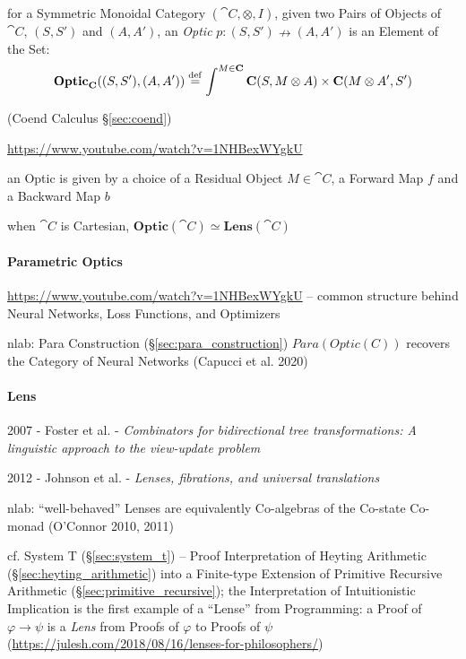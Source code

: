 for a Symmetric Monoidal Category $(\cat{C}, \otimes, I)$, given two Pairs of
Objects of $\cat{C}$, $(S, S')$ and $(A, A')$, an \emph{Optic}
$p : (S, S') \nrightarrow (A, A')$ is an Element of the Set:
\[
  \mathbf{Optic}_\mathbf{C} ((S, S'), (A, A')) \stackrel{\mathrm{def}}=
    \int^{M\in\mathbf{C}} \mathbf{C}(S, M \otimes A) \times \mathbf{C}(M \otimes A', S')
\]

(Coend Calculus \S\ref{sec:coend})

\asterism

\url{https://www.youtube.com/watch?v=1NHBexWYgkU}

an Optic is given by a choice of a Residual Object $M \in \cat{C}$, a Forward
Map $f$ and a Backward Map $b$

when $\cat{C}$ is Cartesian,
$\mathbf{Optic}(\cat{C}) \simeq \mathbf{Lens}(\cat{C})$



\paragraph{Parametric Optics}\label{sec:parametric_optics}\hfill

\url{https://www.youtube.com/watch?v=1NHBexWYgkU} -- common structure behind
Neural Networks, Loss Functions, and Optimizers

nlab: Para Construction (\S\ref{sec:para_construction}) $Para(Optic(C))$
recovers the Category of Neural Networks (Capucci et al. 2020)



\paragraph{Lens}\label{sec:lens}\hfill

2007 - Foster et al. - \emph{Combinators for bidirectional tree transformations:
A linguistic approach to the view-update problem}

2012 - Johnson et al. - \emph{Lenses, fibrations, and universal translations}

nlab: ``well-behaved'' Lenses are equivalently Co-algebras of the Co-state
Co-monad (O'Connor 2010, 2011)

\fist cf. System T (\S\ref{sec:system_t}) -- Proof Interpretation of Heyting
Arithmetic (\S\ref{sec:heyting_arithmetic}) into a Finite-type Extension of
Primitive Recursive Arithmetic (\S\ref{sec:primitive_recursive}); the
Interpretation of Intuitionistic Implication is the first example of a ``Lense''
from Programming: a Proof of $\varphi \rightarrow \psi$ is a \emph{Lens} from
Proofs of $\varphi$ to Proofs of $\psi$
(\url{https://julesh.com/2018/08/16/lenses-for-philosophers/})

